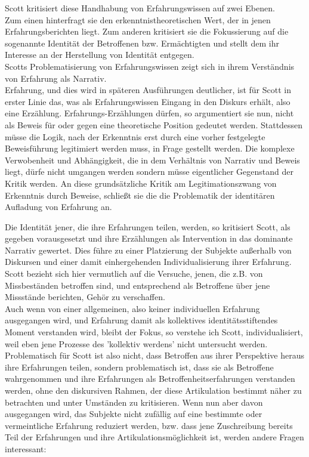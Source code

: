 Scott kritisiert diese Handhabung von Erfahrungswissen auf zwei Ebenen.\\
 Zum
einen hinterfragt sie den erkenntnistheoretischen Wert, der in jenen
Erfahrungsberichten liegt. Zum anderen kritisiert sie die Fokussierung auf die
sogenannte Identität der Betroffenen bzw. Ermächtigten und stellt dem ihr
Interesse an der Herstellung von Identität entgegen.\\
Scotts Problematisierung
von Erfahrungswissen zeigt sich in ihrem Verständnis von Erfahrung als
Narrativ.\\
 Erfahrung, und dies wird in späteren Ausführungen deutlicher, ist für
Scott in erster Linie das, was als Erfahrungswissen Eingang in den Diskurs
erhält, also eine Erzählung. Erfahrungs-Erzählungen dürfen, so argumentiert sie
nun, nicht als Beweis für oder gegen eine theoretische Position gedeutet
werden. Stattdessen müsse die Logik, nach der Erkenntnis erst durch eine vorher
festgelegte Beweisführung legitimiert werden muss, in Frage gestellt werden.
Die komplexe Verwobenheit und Abhängigkeit, die in dem Verhältnis von Narrativ
und Beweis liegt, dürfe nicht umgangen werden sondern müsse eigentlicher
Gegenstand der Kritik werden. An diese grundsätzliche Kritik am
Legitimationszwang von Erkenntnis durch Beweise, schließt sie die die
Problematik der identitären Aufladung von Erfahrung an.


Die Identität jener, die ihre Erfahrungen teilen, werden, so kritisiert Scott,
als gegeben vorausgesetzt und ihre Erzählungen als Intervention in das
dominante Narrativ gewertet. Dies führe zu einer Platzierung der Subjekte
außerhalb von Diskursen und einer damit einhergehenden Individualisierung ihrer
Erfahrung. Scott bezieht sich hier vermutlich auf die Versuche, jenen, die z.B.
von Missbeständen betroffen sind, und entsprechend als Betroffene über jene
Missstände berichten, Gehör zu verschaffen. \\
Auch wenn von einer allgemeinen,
also keiner individuellen Erfahrung ausgegangen wird, und Erfahrung damit als
kollektives identitätsstiftendes Moment verstanden wird, bleibt der Fokus, so
verstehe ich Scott, individualisiert, weil eben jene Prozesse des 'kollektiv
werdens' nicht untersucht werden.\\
Problematisch für Scott ist also nicht, dass
Betroffen aus ihrer Perspektive heraus ihre Erfahrungen teilen, sondern
problematisch ist, dass sie als Betroffene wahrgenommen und ihre Erfahrungen
als Betroffenheitserfahrungen verstanden werden, ohne den diskursiven Rahmen,
der diese Artikulation bestimmt näher zu betrachten und unter Umständen zu
kritisieren. Wenn nun aber davon ausgegangen wird, das Subjekte nicht zufällig
auf eine bestimmte oder vermeintliche Erfahrung reduziert werden, bzw. dass
jene Zuschreibung bereits Teil der Erfahrungen und ihre
Artikulationsmöglichkeit ist, werden andere Fragen interessant: 

